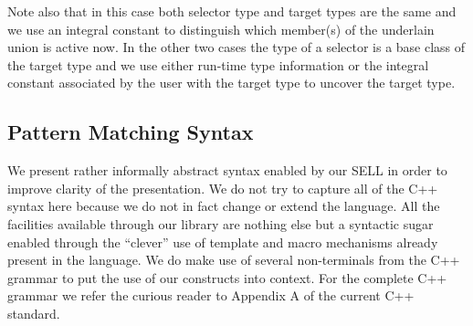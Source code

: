 \documentclass[preprint]{sigplanconf}
\begin{document}
Note also that in this case both selector type and target types are the same and 
we use an integral constant to distinguish which member(s) of the underlain union 
is active now. In the other two cases the type of a selector is a base class of 
the target type and we use either run-time type information or the integral 
constant associated by the user with the target type to uncover the target type. 

\subsection{Pattern Matching Syntax}
\label{sec:syn}

We present rather informally abstract syntax enabled by our SELL in order to 
improve clarity of the presentation. We do not try to capture all of the C++ 
syntax here because we do not in fact change or extend the language. All the 
facilities available through our library are nothing else but a syntactic sugar 
enabled through the ``clever'' use of template and macro mechanisms already 
present in the language. We do make use of several non-terminals from the C++ 
grammar to put the use of our constructs into context. For the complete C++ 
grammar we refer the curious reader to Appendix A of the current C++ 
standard\cite{C++0x}.

\end{document}
